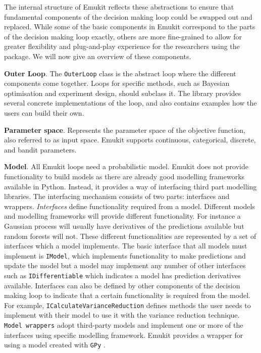 The internal structure of Emukit reflects these abstractions to ensure that fundamental components of the decision making loop could be swapped out and replaced. While some of the basic components in Emukit correspond to the parts of the decision making loop exactly, others are more fine-grained to allow for greater flexibility and plug-and-play experience for the researchers using the package. We will now give an overview of these components.

\textbf{Outer Loop}. The \texttt{OuterLoop} class is the abstract loop where the different components come together. Loops for specific methods, such as Bayesian optimisation and experiment design, should subclass it. The library provides several concrete implementations of the loop, and also contains examples how the users can build their own.

\textbf{Parameter space}. Represents the parameter space of the objective function, also referred to as input space. Emukit supports continuous, categorical, discrete, and bandit parameters.

\textbf{Model}. All Emukit loops need a probabilistic model. Emukit does not provide functionality to build models as there are already good modelling frameworks available in Python. Instead, it provides a way of interfacing third part modelling libraries. The interfacing mechanism consists of two parts: interfaces and wrappers. \textit{Interfaces} define functionality required from a model. Different models and modelling frameworks will provide different functionality. For instance a Gaussian process will usually have derivatives of the predictions available but random forests will not. These different functionalities are represented by a set of interfaces which a model implements. The basic interface that all models must implement is \texttt{IModel}, which implements functionality to make predictions and update the model but a model may implement any number of other interfaces such as \texttt{IDifferentiable} which indicates a model has prediction derivatives available. Interfaces can also be defined by other components of the decision making loop to indicate that a certain functionality is required from the model. For example, \texttt{ICalculateVarianceReduction} defines methods the user needs to implement with their model to use it with the variance reduction technique. \texttt{Model wrappers} adopt third-party models and implement one or more of the interfaces using specific modelling framework. Emukit provides a wrapper for using a model created with \texttt{GPy} \cite{gpy2014}.

